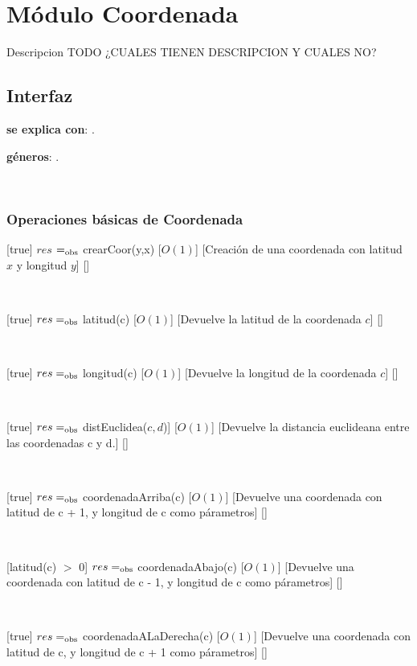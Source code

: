 \section{Módulo Coordenada}

Descripcion TODO ¿CUALES TIENEN DESCRIPCION Y CUALES NO?

\subsection{Interfaz}

\textbf{se explica con}: .

\textbf{géneros}: .

~

\subsubsection{Operaciones básicas de Coordenada}

[true]
{$res$ $=_{\mathrm{obs}}$ crearCoor(y,x)}
[$O(1)$]
[Creación de una coordenada con latitud $x$ y longitud $y$]
[]

~

[true]
{$res =_{\mathrm{obs}}$ latitud(c)}
[$O(1)$]
[Devuelve la latitud de la coordenada $c$]
[]

~

[true]
{$res =_{\mathrm{obs}}$ longitud(c)}
[$O(1)$]
[Devuelve la longitud de la coordenada $c$]
[]

~

[true]
{$res =_{\mathrm{obs}}$ distEuclidea($c, d$)]}
[$O(1)$]
[Devuelve la distancia euclideana entre las coordenadas c y d.]
[]

~

[true]
{$res =_{\mathrm{obs}}$ coordenadaArriba(c)}
[$O(1)$]
[Devuelve una coordenada con latitud de c + 1, y longitud de c como párametros]
[]

~

[latitud(c) $>$ 0]
{$res =_{\mathrm{obs}}$ coordenadaAbajo(c)}
[$O(1)$]
[Devuelve una coordenada con latitud de c - 1, y longitud de c como párametros]
[]

~

[true]
{$res =_{\mathrm{obs}}$ coordenadaALaDerecha(c)}
[$O(1)$]
[Devuelve una coordenada con latitud de c, y longitud de c + 1 como párametros]
[]

